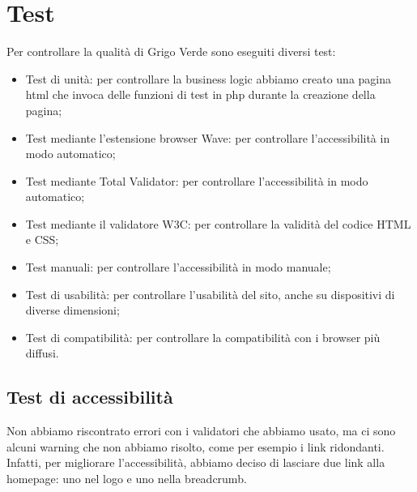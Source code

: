 \section{Test}
\label{sec:test}

Per controllare la qualità di Grigo Verde sono eseguiti diversi test:
\begin{itemize}
	\item Test di unità: per controllare la business logic abbiamo creato una
	      pagina html che invoca delle funzioni di test in php durante la
	      creazione della pagina;

	\item Test mediante l'estensione browser Wave: per controllare
	      l'accessibilità in modo automatico;

	\item Test mediante Total Validator: per controllare l'accessibilità in modo
	      automatico;

	\item Test mediante il validatore W3C: per controllare la validità del codice
	      HTML e CSS;

	\item Test manuali: per controllare l'accessibilità in modo manuale;

	\item Test di usabilità: per controllare l'usabilità del sito, anche su
	      dispositivi di diverse dimensioni;

	\item Test di compatibilità: per controllare la compatibilità con i browser
	      più diffusi.
\end{itemize}

\subsection{Test di accessibilità}

Non abbiamo riscontrato errori con i validatori che abbiamo usato, ma ci sono
alcuni warning che non abbiamo risolto, come per esempio i link ridondanti.
Infatti, per migliorare l'accessibilità, abbiamo deciso di lasciare due link
alla homepage: uno nel logo e uno nella breadcrumb.
